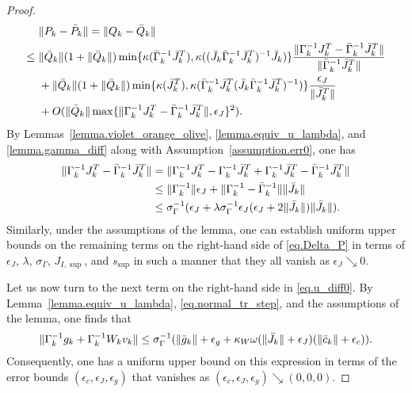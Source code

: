 \begin{proof}
\begin{align}
          &\ \|P_k - {\bar P}_k \| = \| Q_k -  {\bar Q}_k \| \nonumber \\
      \leq&\ \|{\bar Q}_k \|(1 + \|{\bar Q}_k \|) \min \{ \kappa({\bar \Gamma}_k^{-1} {\bar J}_k^T),  \kappa (({\bar J}_k {\bar \Gamma}_k^{-1}{\bar J}_k^T)^{-1} {\bar J}_k) \} \frac{\|\Gamma_k^{-1} J_k^T - {\bar \Gamma}_k^{-1} {\bar J}_k^T\|}{\|{\bar \Gamma}_k^{-1} {\bar J}_k^T\|} \nonumber \\
          &\ +  \|{\bar Q}_k \|(1 + \|{\bar Q}_k \|)  \min \{\kappa({\bar J}_k^T), \kappa ({\bar \Gamma}_k^{-1} {\bar J}_k^T({\bar J}_k {\bar \Gamma}_k^{-1}{\bar J}_k^T)^{-1} ) \} \frac{\epsilon_J}{\|{\bar J}_k^T\|} \nonumber \\
          &\ + O( \|{\bar Q}_k \| \max\{\|\Gamma_k^{-1} J_k^T - {\bar \Gamma}_k^{-1} {\bar J}_k^T\|, \epsilon_J \}^2). \label{eq.Delta_P}
  \end{align}
  By Lemmas~\ref{lemma.violet_orange_olive}, \ref{lemma.equiv_u_lambda}, and  \ref{lemma.gamma_diff} along with Assumption~\ref{assumption.err0}, one has
  \begin{align*}
    \|\Gamma_k^{-1} J_k^T - {\bar \Gamma}_k^{-1} {\bar J}_k^T\| 
    &=  \|\Gamma_k^{-1} J_k^T - \Gamma_k^{-1} {\bar J}_k^T + \Gamma_k^{-1} {\bar J}_k^T - {\bar \Gamma}_k^{-1} {\bar J}_k^T\| \\
    &\leq \|\Gamma_k^{-1}\| \epsilon_J + \|\Gamma_k^{-1} - {\bar \Gamma}_k^{-1}\| \|{\bar J}_k\|  \\
    &\leq \sigma_{\Gamma}^{-1} (\epsilon_J + \lambda \sigma_{\Gamma}^{-1} \epsilon_J (\epsilon_J + 2 \|{\bar J}_k\|) \|{\bar J}_k\| ).
  \end{align*}
  Similarly, under the assumptions of the lemma, one can establish uniform upper bounds on the remaining terms on the right-hand side of \eqref{eq.Delta_P} in terms of $\epsilon_J$, $\lambda$, $\sigma_\Gamma$, $J_{I,\sup}$, and $s_{\sup}$ in such a manner that they all vanish as $\epsilon_J \searrow 0$.
  
  Let us now turn to the next term on the right-hand side in \eqref{eq.u_diff0}.  By Lemma~\ref{lemma.equiv_u_lambda}, \eqref{eq.normal_tr_step}, and the assumptions of the lemma, one finds that
  \begin{equation*}
    \| \Gamma_k^{-1} g_k +  \Gamma_k^{-1} W_k v_k \|\leq \sigma_{\Gamma}^{-1} (\|{\bar g}_k\| + \epsilon_g + \kappa_W \omega (\|{\bar J}_k \| + \epsilon_J) (\|{\bar c}_k\| + \epsilon_c) ).
  \end{equation*}
  Consequently, one has a uniform upper bound on this expression in terms of the error bounds $(\epsilon_c,\epsilon_J,\epsilon_g)$ that vanishes as $(\epsilon_c,\epsilon_J,\epsilon_g) \searrow (0,0,0)$.
  

\end{proof}
